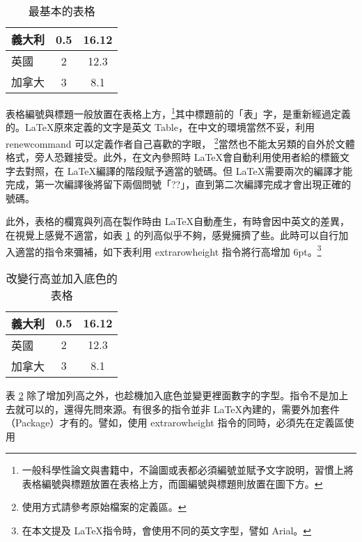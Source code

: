 \begin{table}[h] %
\centering
\caption{最基本的表格}\label{tb:basic_1}  %
\begin{tabular}{lcc}
    \hline
  義大利	& 0.5	& 16.12		\\\hline  %
  英國	& 2    	& 12.3		\\\hline
  加拿大	& 3    	& 8.1		\\\hline
\end{tabular}
\end{table}

表格編號與標題一般放置在表格上方，\footnote{一般科學性論文與書籍中，不論圖或表都必須編號並賦予文字說明，習慣上將表格編號與標題放置在表格上方，而圖編號與標題則放置在圖下方。}其中標題前的「表」字，是重新經過定義的。\LaTeX 原來定義的文字是英文 Table，在中文的環境當然不妥，利用 {\A renewcommand} 可以定義作者自己喜歡的字眼， \footnote{使用方式請參考原始檔案的定義區。}當然也不能太另類的自外於文體格式，旁人恐難接受。此外，在文內參照時 \LaTeX 會自動利用使用者給的標籤文字去對照，在 \LaTeX 編譯的階段賦予適當的號碼。但 \LaTeX 需要兩次的編譯才能完成，第一次編譯後將留下兩個問號「??」，直到第二次編譯完成才會出現正確的號碼。

此外，表格的欄寬與列高在製作時由 \LaTeX 自動產生，有時會因中英文的差異，在視覺上感覺不適當，如表 \ref{tb:basic_1} 的列高似乎不夠，感覺擁擠了些。此時可以自行加入適當的指令來彌補，如下表利用  {\A extrarowheight} 指令將行高增加  6pt。\footnote{在本文提及 \LaTeX 指令時，會使用不同的英文字型，譬如 {\A Arial}。}


\begin{table}[h]
\centering

\caption{改變行高並加入底色的表格}\label{tb:basic_row_color}  %
\extrarowheight=6pt   %
\colorbox{slight}{\begin{tabular}{lcc}
\hline
  義大利	& 0.5	& 16.12		\\\hline  %
  英國	& 2     	& 12.3		\\\hline
  加拿大 	& 3     	& 8.1		\\\hline
\end{tabular}}
\end{table}

表 \ref{tb:basic_row_color} 除了增加列高之外，也趁機加入底色並變更裡面數字的字型。指令不是加上去就可以的，還得先問來源。有很多的指令並非 \LaTeX 內建的，需要外加套件（Package）才有的。譬如，使用 {\A extrarowheight} 指令的同時，必須先在定義區使用

